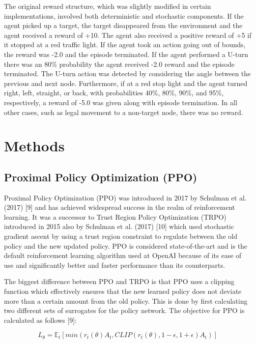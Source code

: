 \documentclass{article}
\begin{document}
	The original reward structure, which was slightly modified in certain implementations, involved both deterministic and stochastic components. If the agent picked up a target, the target disappeared from the environment and the agent received a reward of +10. The agent also received a positive reward of +5 if it stopped at a red traffic light. If the agent took an action going out of bounds, the reward was -2.0 and the episode terminated. If the agent performed a U-turn there was an 80\% probability the agent received -2.0 reward and the episode terminated. The U-turn action was detected by considering the angle between the previous and next node. Furthermore, if at a red stop light and the agent turned right, left, straight, or back, with probabilities 40\%, 80\%, 90\%, and 95\%, respectively, a reward of -5.0 was given along with episode termination. In all other cases, such as legal movement to a non-target node, there was no reward.
	
	\section{Methods}
	\subsection{Proximal Policy Optimization (PPO)}
	\label{ppo}
	
	Proximal Policy Optimization (PPO) was introduced in 2017 by Schulman et al. (2017) [9] and has achieved widespread success in the realm of reinforcement learning. It was a successor to Trust Region Policy Optimization (TRPO) introduced in 2015 also by Schulman et al. (2017) [10] which used stochastic gradient ascent by using a trust region constraint to regulate between the old policy and the new updated policy. PPO is considered state-of-the-art and is the default reinforcement learning algorithm used at OpenAI because of its ease of use and significantly better and faster performance than its counterparts. 
	
	The biggest difference between PPO and TRPO is that PPO uses a clipping function which effectively ensures that the new learned policy does not deviate more than a certain amount from the old policy. This is done by first calculating two different sets of surrogates for the policy network. The objective for PPO is calculated as follows [9]:
	
	\begin{equation}
		L_{\theta} = \mathbb{E}_{t}[min(r_{t}({\theta})A_{t}, CLIP(r_{t}({\theta}), 1-\epsilon, 1+\epsilon)A_{t})]
	\end{equation}
	
\end{document}
